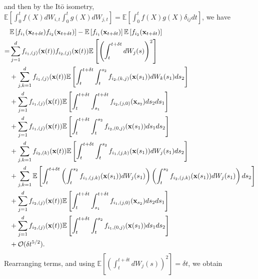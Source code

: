 %
and then by the It\={o} isometry, $\mathbb{E} \left[ \int_0^t f(X) dW_{i,t} \int_0^t g(X) dW_{j,t} \right] = \mathbb{E} \left[ \int_0^t f(X) g(X) \delta_{ij} dt \right]$, we have
\begin{equation}
\begin{aligned}
&\mathbb{E} \left[ f_{i_1}(\mathbf{x}_{t + \delta t}) f_{i_2}(\mathbf{x}_{t + \delta t}) \right] 
- \mathbb{E} \left[ f_{i_1}(\mathbf{x}_{t + \delta t}) \right] \mathbb{E} \left[ f_{i_2}(\mathbf{x}_{t + \delta t}) \right] \\
=& 
 \sum_{j=1}^d f_{{i_1},(j)}(\mathbf{x}(t)) f_{{i_2},(j)}(\mathbf{x}(t)) \mathbb{E} \left[ \left( \int_t^{t + \delta t} dW_j(s) \right)^2 \right] \\
&+ \sum_{j,k=1}^d f_{{i_1},(j)}(\mathbf{x}(t)) \mathbb{E} \left[  \int_t^{t+\delta t} \int_t^{s_2} f_{{i_2},(k,j)}(\mathbf{x}(s_1)) dW_k(s_1) ds_2 \right] \\
&+ \sum_{j=1}^d f_{{i_1},(j)}(\mathbf{x}(t)) \mathbb{E} \left[ \int_t^{t+\delta t} \int_{s_1}^{t+\delta t} f_{{i_2},(j,0)}(\mathbf{x}_{s_2}) ds_2 ds_1 \right]\\
&+ \sum_{j=1}^d f_{{i_1},(j)}(\mathbf{x}(t)) \mathbb{E} \left[  \int_t^{t+\delta t} \int_t^{s_2} f_{{i_2},(0,j)}(\mathbf{x}(s_1)) ds_1 ds_2\right] \\
&+  \sum_{j, k=1}^d  f_{{i_2},(k)}(\mathbf{x}(t))\mathbb{E} \left[ \int_t^{t+\delta t} \int_t^{s_2} f_{{i_1},(j,k)}(\mathbf{x}(s_1)) dW_j(s_1) ds_2 \right] \\
&+ \sum_{j, k=1}^d \mathbb{E} \left[ \int_t^{t+\delta t}\left( \int_t^{s_2} f_{{i_1},(j,k)}(\mathbf{x}(s_1)) dW_j(s_1)  \right) \left(  \int_t^{s_2} f_{{i_2},(j,k)}(\mathbf{x}(s_1)) dW_j(s_1) \right) ds_2 \right] \\
&+  \sum_{j=1}^d f_{{i_2},(j)}(\mathbf{x}(t)) \mathbb{E} \left[ \int_t^{t+\delta t} \int_{s_1}^{t + \delta t} f_{{i_1},(j,0)}(\mathbf{x}_{s_2}) ds_2 ds_1 \right]\\
&+   \sum_{j=1}^d  f_{{i_2},(j)}(\mathbf{x}(t)) \mathbb{E} \left[ \int_t^{t+\delta t} \int_t^{s_2} f_{{i_1},(0,j)}(\mathbf{x}(s_1)) ds_1 ds_2 \right] \\
&+ \mathcal{O} (\delta t^{5/2}) .
\end{aligned}
\end{equation}
%
Rearranging terms, and using $\mathbb{E} \left[ \left( \int_t^{t + \delta t} dW_j(s) \right)^2 \right] = \delta t$, we obtain
